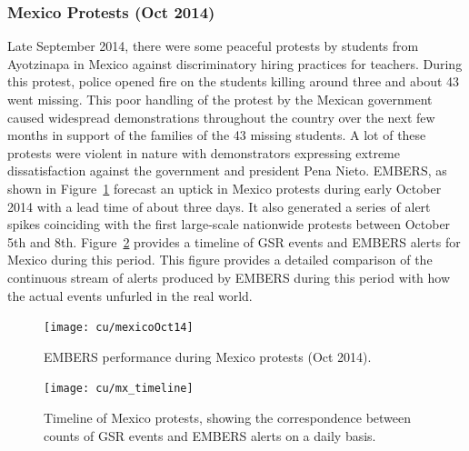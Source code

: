 \subsubsection*{Mexico Protests (Oct 2014)}
\label{sec:mexico}
Late September 2014, there were some peaceful protests by students from Ayotzinapa
in Mexico against discriminatory hiring practices for teachers. During this protest,
police opened fire on the students killing around three and about 43 went missing. This poor
handling of the protest by the Mexican government caused widespread demonstrations throughout
the country over the next few months in support of the families of the 43 missing students.
A lot of these protests were violent in nature with demonstrators expressing extreme
dissatisfaction against the government and president Pena Nieto. EMBERS, as
shown in Figure~\ref{fig:mexicoOct14}
forecast an uptick in Mexico protests during early October 2014 with a lead time of about three days.
It also generated  a series of alert spikes coinciding with the first
large-scale nationwide protests between October 5th and 8th.
Figure~\ref{fig:mexicoTimeline} provides a timeline of GSR events and
EMBERS alerts for Mexico during this period. This figure provides a detailed
comparison of the continuous stream of alerts produced by EMBERS during this period with how
the actual events unfurled in the real world.

\begin{figure}[H]
\centering
\texttt{[image: cu/mexicoOct14]}
\caption{EMBERS performance during Mexico protests (Oct 2014).}
\label{fig:mexicoOct14}
\end{figure}

\begin{figure}
\centering
\texttt{[image: cu/mx\_timeline]}
\caption{Timeline of Mexico protests, showing the correspondence
between counts of GSR events and EMBERS alerts on a daily basis.}
\label{fig:mexicoTimeline}
\end{figure}

